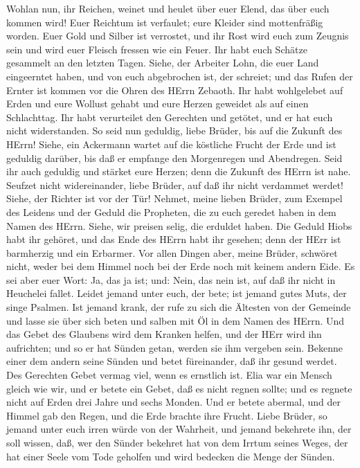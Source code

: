  Wohlan nun, ihr Reichen, weinet und heulet über euer Elend,
das über euch kommen wird!  Euer Reichtum ist verfaulet;
eure Kleider sind mottenfräßig worden.  Euer Gold und Silber
ist verrostet, und ihr Rost wird euch zum Zeugnis sein und wird euer
Fleisch fressen wie ein Feuer. Ihr habt euch Schätze gesammelt an den
letzten Tagen.  Siehe, der Arbeiter Lohn, die euer Land
eingeerntet haben, und von euch abgebrochen ist, der schreiet; und das
Rufen der Ernter ist kommen vor die Ohren des HErrn Zebaoth.
 Ihr habt wohlgelebet auf Erden und eure Wollust gehabt und
eure Herzen geweidet als auf einen Schlachttag.  Ihr habt
verurteilet den Gerechten und getötet, und er hat euch nicht
widerstanden.  So seid nun geduldig, liebe Brüder, bis auf
die Zukunft des HErrn! Siehe, ein Ackermann wartet auf die köstliche
Frucht der Erde und ist geduldig darüber, bis daß er empfange den
Morgenregen und Abendregen.  Seid ihr auch geduldig und
stärket eure Herzen; denn die Zukunft des HErrn ist nahe. 
Seufzet nicht widereinander, liebe Brüder, auf daß ihr nicht verdammet
werdet! Siehe, der Richter ist vor der Tür!  Nehmet, meine
lieben Brüder, zum Exempel des Leidens und der Geduld die Propheten, die
zu euch geredet haben in dem Namen des HErrn.  Siehe, wir
preisen selig, die erduldet haben. Die Geduld Hiobs habt ihr gehöret,
und das Ende des HErrn habt ihr gesehen; denn der HErr ist barmherzig
und ein Erbarmer.  Vor allen Dingen aber, meine Brüder,
schwöret nicht, weder bei dem Himmel noch bei der Erde noch mit keinem
andern Eide. Es sei aber euer Wort: Ja, das ja ist; und: Nein, das nein
ist, auf daß ihr nicht in Heuchelei fallet.  Leidet jemand
unter euch, der bete; ist jemand gutes Muts, der singe Psalmen.
 Ist jemand krank, der rufe zu sich die Ältesten von der
Gemeinde und lasse sie über sich beten und salben mit Öl in dem Namen
des HErrn.  Und das Gebet des Glaubens wird dem Kranken
helfen, und der HErr wird ihn aufrichten; und so er hat Sünden getan,
werden sie ihm vergeben sein.  Bekenne einer dem andern
seine Sünden und betet füreinander, daß ihr gesund werdet. Des Gerechten
Gebet vermag viel, wenn es ernstlich ist.  Elia war ein
Mensch gleich wie wir, und er betete ein Gebet, daß es nicht regnen
sollte; und es regnete nicht auf Erden drei Jahre und sechs Monden.
 Und er betete abermal, und der Himmel gab den Regen, und
die Erde brachte ihre Frucht.  Liebe Brüder, so jemand
unter euch irren würde von der Wahrheit, und jemand bekehrete ihn,
 der soll wissen, daß, wer den Sünder bekehret hat von dem
Irrtum seines Weges, der hat einer Seele vom Tode geholfen und wird
bedecken die Menge der Sünden.
